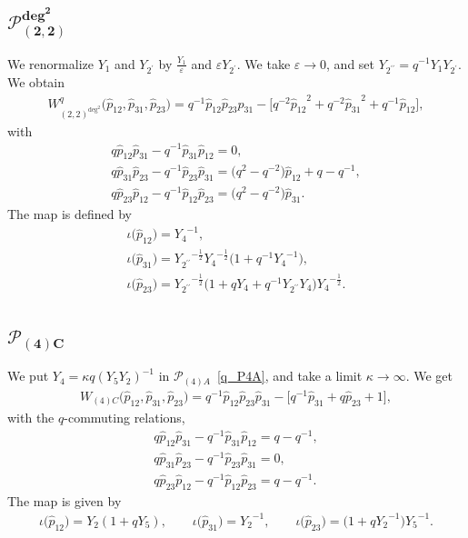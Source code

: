 \documentclass[pdftex]{sigma}
\numberwithin{equation}{section}
\begin{document}
\subsection[$\mathcal{P}_{(2,2)}^{\text{deg}^2}$]{$\boldsymbol{\mathcal{P}_{(2,2)}^{\text{deg}^2}}$}
We renormalize $Y_1$ and $Y_{2^\prime}$ by $\frac{Y_1}{\varepsilon}$ and $\varepsilon Y_{2^\prime}$. We take $\varepsilon\to 0$, and set $Y_{2^{\prime \prime}}= q^{-1} Y_1 Y_{2^\prime}$. We obtain
\begin{gather*}
 W^q_{(2,2)^{\text{deg}^2}}\big( \hat{p}_{12}, \hat{p}_{31}, \hat{p}_{23} \big) = q^{-1} \hat{p}_{12} \hat{p}_{23} \hat{p}_{31} -\big[ q^{-2} {\hat{p}_{12}}^{2} + q^{-2} {\hat{p}_{31}}^{2} + q^{-1} \hat{p}_{12}\big] ,
\end{gather*}
with
\begin{gather*}
q \hat{p}_{12} \hat{p}_{31} - q^{-1} \hat{p}_{31} \hat{p}_{12} = 0 , \\
q \hat{p}_{31} \hat{p}_{23} - q^{-1} \hat{p}_{23} \hat{p}_{31} = \big(q^2 - q^{-2}\big) \hat{p}_{12} + q - q^{-1} , \\
q \hat{p}_{23} \hat{p}_{12} - q^{-1} \hat{p}_{12} \hat{p}_{23} = \big(q^2 - q^{-2}\big) \hat{p}_{31} .
\end{gather*}
The map is defined by
\begin{gather*}
\iota\big(\hat{p}_{12}\big) = {Y_4}^{-1} , \\
\iota\big(\hat{p}_{31}\big) = {Y_{2^{\prime\prime}}}^{-\frac{1}{2}} {Y_4}^{-\frac{1}{2}}\big( 1 + q^{-1} {Y_4}^{-1}\big) , \\
\iota\big(\hat{p}_{23}\big) = {Y_{2^{\prime\prime}}}^{-\frac{1}{2}} \big( 1 + q Y_4+ q^{-1} {Y_{2^{\prime\prime}}} Y_4\big) {Y_4}^{-\frac{1}{2}} .
\end{gather*}

\subsection[$\mathcal{P}_{(4)C}$]{$\boldsymbol{\mathcal{P}_{(4)C}}$}
We put $Y_4=\kappa q ( Y_5 Y_2)^{-1}$ in $\mathcal{P}_{(4)A}$~\eqref{q_P4A}, and take a limit $\kappa\to\infty$. We get
\begin{gather*}
 W_{(4)C}\big( \hat{p}_{12}, \hat{p}_{31}, \hat{p}_{23}\big) = q^{-1} \hat{p}_{12} \hat{p}_{23} \hat{p}_{31} -\big[ q^{-1} \hat{p}_{31} + q \hat{p}_{23} + 1\big],
\end{gather*}
with the $q$-commuting relations,
\begin{gather*}
q \hat{p}_{12} \hat{p}_{31} - q^{-1} \hat{p}_{31} \hat{p}_{12} = q-q^{-1} , \\
q \hat{p}_{31} \hat{p}_{23} - q^{-1} \hat{p}_{23} \hat{p}_{31} = 0 , \\
q \hat{p}_{23} \hat{p}_{12} - q^{-1} \hat{p}_{12} \hat{p}_{23} = q - q^{-1} .
\end{gather*}
The map is given by
\begin{gather*}%
 \iota\big(\hat{p}_{12}\big) = {Y_2} ( 1 + q {Y_5} ) , \qquad \iota\big(\hat{p}_{31}\big) = {Y_2}^{-1} ,\qquad \iota\big(\hat{p}_{23}\big) = \big( 1 + q {Y_2}^{-1} \big) {Y_5}^{-1} .
\end{gather*}
\end{document}
